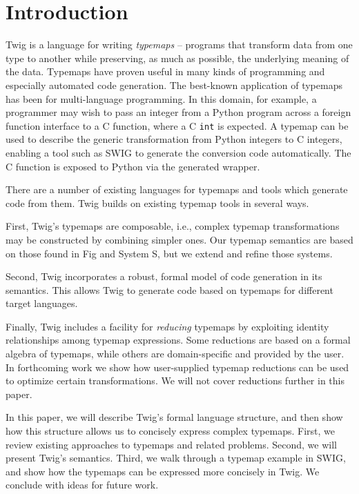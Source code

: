 
\section{Introduction}

Twig is a language for writing \emph{typemaps} -- programs that
transform data from one type to another while preserving, as much
as possible, the underlying meaning of the data. Typemaps have
proven useful in many kinds of programming and especially
automated code generation. The best-known application of typemaps
has been for multi-language programming. In this domain, for
example, a programmer may wish to pass an integer from a Python
program across a foreign function interface to a C function, where
a C \texttt{int} is expected. A typemap can be used to describe
the generic transformation from Python integers to C integers,
enabling a tool such as SWIG to generate the conversion code
automatically. The C function is exposed to Python via the
generated wrapper.

There are a number of existing languages for typemaps and tools
which generate code from them. Twig builds on existing typemap
tools in several ways.

First, Twig's typemaps are composable, i.e., complex typemap
transformations may be constructed by combining simpler ones. Our
typemap semantics are based on those found in Fig\cite{fig} and
System S\cite{system-s}, but we extend and refine those systems.

Second, Twig incorporates a robust, formal model of code
generation in its semantics. This allows Twig to generate code
based on typemaps for different target languages.

Finally, Twig includes a facility for \emph{reducing} typemaps by
exploiting identity relationships among typemap expressions. Some
reductions are based on a formal algebra of typemaps, while others
are domain-specific and provided by the user. In forthcoming work
we show how user-supplied typemap reductions can be used to
optimize certain transformations. We will not cover reductions
further in this paper.

In this paper, we will describe Twig's formal language structure,
and then show how this structure allows us to concisely express
complex typemaps. First, we review existing approaches to typemaps
and related problems. Second, we will present Twig's semantics.
Third, we walk through a typemap example in SWIG, and show how the
typemaps can be expressed more concisely in Twig. We conclude with
ideas for future work.
